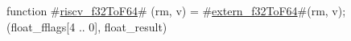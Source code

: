 function #\hyperref[sailRISCVzriscvzyf32ToF64]{riscv\_f32ToF64}# (rm, v) = {
  #\hyperref[sailRISCVzexternzyf32ToF64]{extern\_f32ToF64}#(rm, v);
  (float_fflags[4 .. 0], float_result)
}
